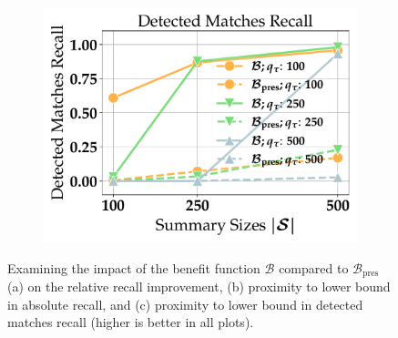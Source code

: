 \begin{figure}[t]
	\begin{subfigure}{.32\linewidth}
		\centering
		\includegraphics[width=1.0\linewidth]{revision_plots/detected_matches_recall_stream_size_2000.pdf}
		\vspace{-18pt}
		\caption{}
		\label{plot:detected_matches_recall_2000}
	\end{subfigure}
	\vspace{-1em}
	\caption{Examining the impact of the benefit function $\mathcal{B}$ compared to $\mathcal{B}_{\text{pres}}$ (a)
	on the relative recall improvement, (b) proximity to lower
	bound in absolute recall, and (c)
	proximity to lower bound in detected matches recall
	(higher is better in all plots).}
	\label{fig:ablation_study_and_recall}
	\vspace{-1em}
\end{figure}


